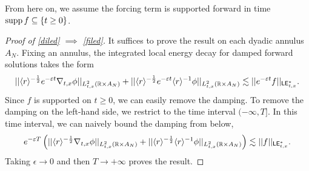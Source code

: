 From here on, we assume the forcing term is supported forward in time $\operatorname{supp} f \subseteq \{t \geq 0\}$. 

\begin{proof}[Proof of \eqref{diled} $\implies$ \eqref{filed}]
	It suffices to prove the result on each dyadic annulus $A_N$. Fixing an annulus, the integrated local energy decay for damped forward solutions takes the form 
		\[
			|| \langle r \rangle^{-\frac12} e^{-\varepsilon t} \nabla_{t, x} \phi||_{L^2_{t, x} (\mathbb R \times A_N)} + || \langle r \rangle^{-\frac12} e^{-\varepsilon t} \langle r \rangle^{-1} \phi||_{L^2_{t, x} (\mathbb R \times A_N)} \lesssim ||e^{-\varepsilon t} f||_{\mathsf{LE}^*_{t, x}}.
		\]
	Since $f$ is supported on $t \geq 0$, we can easily remove the damping. To remove the damping on the left-hand side, we restrict to the time interval $(- \infty, T]$. In this time interval,  we can naively bound the damping from below,
		\[
			e^{-\varepsilon T} \left( || \langle r \rangle^{-\frac12} \nabla_{t, x} \phi||_{L^2_{t, x} (\mathbb R \times A_N)} + || \langle r \rangle^{-\frac12} \langle r \rangle^{-1} \phi||_{L^2_{t, x} (\mathbb R \times A_N)}\right) \lesssim ||f||_{\mathsf{LE}^*_{t, x}}.
		\]
	Taking $\epsilon \to 0$ and then $T \to + \infty$ proves the result. 	
\end{proof}


